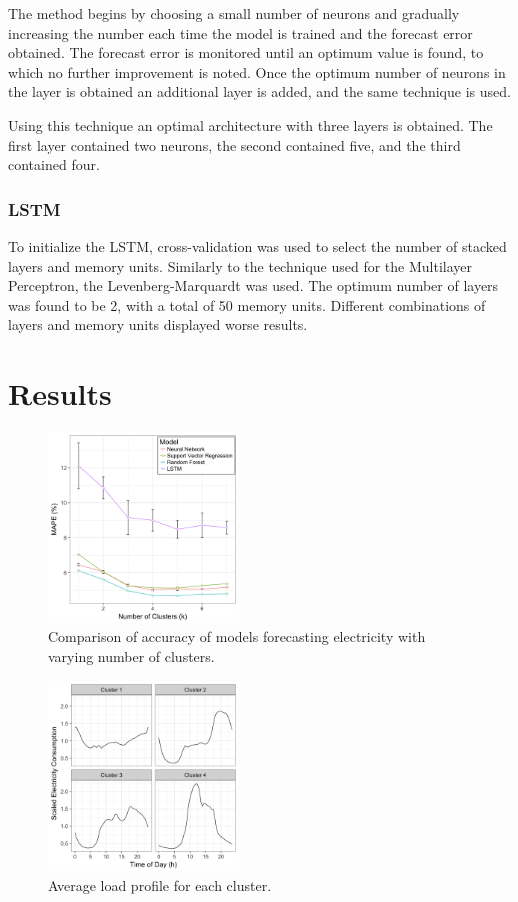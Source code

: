The method begins by choosing a small number of neurons and gradually increasing the number each time the model is trained and the forecast error obtained. The forecast error is monitored until an optimum value is found, to which no further improvement is noted. Once the optimum number of neurons in the layer is obtained an additional layer is added, and the same technique is used.

Using this technique an optimal architecture with three layers is obtained. The first layer contained two neurons, the second contained five, and the third contained four.



\subsubsection{LSTM}

To initialize the LSTM, cross-validation was used to select the number of stacked layers and memory units. Similarly to the technique used for the Multilayer Perceptron, the Levenberg-Marquardt was used. The optimum number of layers was found to be 2, with a total of 50 memory units. Different combinations of layers and memory units displayed worse results.



\section{Results}


\begin{figure}
	\includegraphics[width=0.45\textwidth]{figures/results.png}
	\caption{Comparison of accuracy of models forecasting electricity with varying number of clusters.}
	\label{fig:results}
\end{figure}

\begin{figure}
	\includegraphics[width=0.45\textwidth]{figures/Cluster_Centres.png}
	\caption{Average load profile for each cluster.}
	\label{fig:clustercentre}
\end{figure}

